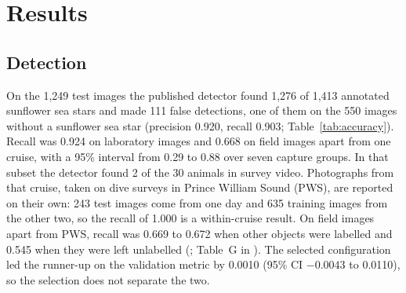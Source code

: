 \section*{Results}

\subsection*{Detection}

On the 1,249 test images the published detector found 1,276 of 1,413 annotated sunflower sea stars and made 111 false detections, one of them on the 550 images without a sunflower sea star (precision 0.920, recall 0.903; Table~\ref{tab:accuracy}).
Recall was 0.924 on laboratory images and 0.668 on field images apart from one cruise, with a 95\% interval from 0.29 to 0.88 over seven capture groups.
In that subset the detector found 2 of the 30 animals in survey video.
Photographs from that cruise, taken on dive surveys in Prince William Sound (PWS), are reported on their own: 243 test images come from one day and 635 training images from the other two, so the recall of 1.000 is a within-cruise result.
On field images apart from PWS, recall was 0.669 to 0.672 when other objects were labelled and 0.545 when they were left unlabelled (; Table~G in ).
The selected configuration led the runner-up on the validation metric by 0.0010 (95\% CI $-0.0043$ to 0.0110), so the selection does not separate the two.

